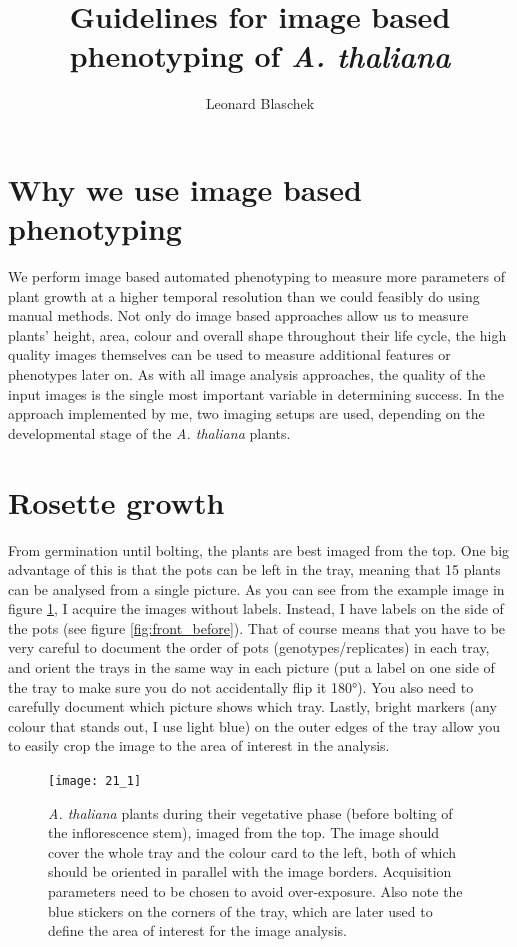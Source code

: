 \documentclass[10pt]{article}
\title{Guidelines for image based phenotyping of \textit{A. thaliana}}
\author{Leonard Blaschek}
\begin{document}
 	\maketitle
 	
 	\section*{Why we use image based phenotyping}
 	
	We perform image based automated phenotyping to measure more parameters of plant growth at a higher temporal resolution than we could feasibly do using manual methods. Not only do image based approaches allow us to measure plants' height, area, colour and overall shape throughout their life cycle, the high quality images themselves can be used to measure additional features or phenotypes later on. As with all image analysis approaches, the quality of the input images is the single most important variable in determining success. In the approach implemented by me, two imaging setups are used, depending on the developmental stage of the \textit{A. thaliana} plants.

 	\section{Rosette growth}
 	
 	From germination until bolting, the plants are best imaged from the top. One big advantage of this is that the pots can be left in the tray, meaning that 15 plants can be analysed from a single picture. As you can see from the example image in figure \ref{fig:top}, I acquire the images without labels. Instead, I have labels on the side of the pots (see figure \ref{fig:front_before}). That of course means that you have to be very careful to document the order of pots (genotypes/replicates) in each tray, and orient the trays in the same way in each picture (put a label on one side of the tray to make sure you do not accidentally flip it 180°). You also need to carefully document which picture shows which tray. Lastly, bright markers (any colour that stands out, I use light blue) on the outer edges of the tray allow you to easily crop the image to the area of interest in the analysis.
 	
 	\begin{figure}[!h]
 		\centering
 		\texttt{[image: 21\_1]}
 		\caption[Example image of a top-view image.]{\textit{A. thaliana} plants during their vegetative phase (before bolting of the inflorescence stem), imaged from the top. The image should cover the whole tray and the colour card to the left, both of which should be oriented in parallel with the image borders. Acquisition parameters need to be chosen to avoid over-exposure. Also note the blue stickers on the corners of the tray, which are later used to define the area of interest for the image analysis.}
 		\label{fig:top}
 	\end{figure}
 
\end{document}
